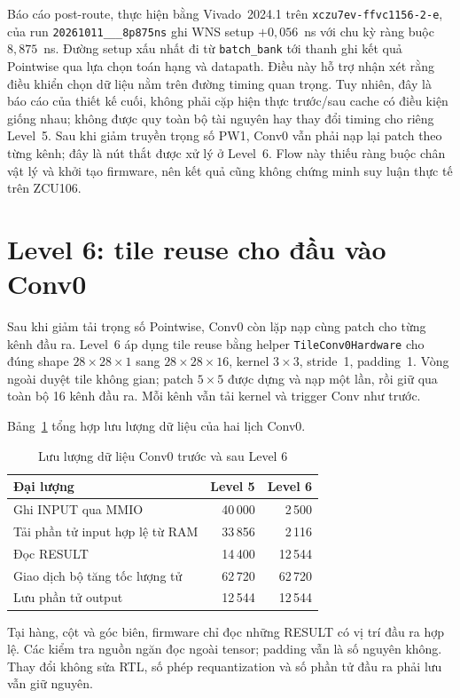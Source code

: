 Báo cáo post-route, thực hiện bằng Vivado~2024.1 trên \texttt{xczu7ev-ffvc1156-2-e}, của run \texttt{20261011\_\_\_\allowbreak8p875ns} ghi WNS setup $+0{,}056$~ns với chu kỳ ràng buộc $8{,}875$~ns. Đường setup xấu nhất đi từ \texttt{batch\_bank} tới thanh ghi kết quả Pointwise qua lựa chọn toán hạng và datapath. Điều này hỗ trợ nhận xét rằng điều khiển chọn dữ liệu nằm trên đường timing quan trọng. Tuy nhiên, đây là báo cáo của thiết kế cuối, không phải cặp hiện thực trước/sau cache có điều kiện giống nhau; không được quy toàn bộ tài nguyên hay thay đổi timing cho riêng Level~5. Sau khi giảm truyền trọng số PW1, Conv0 vẫn phải nạp lại patch theo từng kênh; đây là nút thắt được xử lý ở Level~6. Flow này thiếu ràng buộc chân vật lý và khởi tạo firmware, nên kết quả cũng không chứng minh suy luận thực tế trên ZCU106.

\section{Level 6: tile reuse cho đầu vào Conv0}
Sau khi giảm tải trọng số Pointwise, Conv0 còn lặp nạp cùng patch cho từng kênh đầu ra. Level~6 áp dụng tile reuse bằng helper \texttt{TileConv0Hardware} cho đúng shape $28\times28\times1$ sang $28\times28\times16$, kernel $3\times3$, stride~1, padding~1. Vòng ngoài duyệt tile không gian; patch $5\times5$ được dựng và nạp một lần, rồi giữ qua toàn bộ 16 kênh đầu ra. Mỗi kênh vẫn tải kernel và trigger Conv như trước.

Bảng~\ref{tab:conv0-reuse} tổng hợp lưu lượng dữ liệu của hai lịch Conv0.

\begin{table}[!ht]
\renewcommand{\arraystretch}{1.12}
\centering
\caption{Lưu lượng dữ liệu Conv0 trước và sau Level 6}
\label{tab:conv0-reuse}
\begin{tabular}{lrr}
\hline
Đại lượng & Level 5 & Level 6 \\
\hline
Ghi INPUT qua MMIO & 40\,000 & 2\,500 \\
Tải phần tử input hợp lệ từ RAM & 33\,856 & 2\,116 \\
Đọc RESULT & 14\,400 & 12\,544 \\
Giao dịch bộ tăng tốc lượng tử & 62\,720 & 62\,720 \\
Lưu phần tử output & 12\,544 & 12\,544 \\
\hline
\end{tabular}
\end{table}

Tại hàng, cột và góc biên, firmware chỉ đọc những RESULT có vị trí đầu ra hợp lệ. Các kiểm tra nguồn ngăn đọc ngoài tensor; padding vẫn là số nguyên không. Thay đổi không sửa RTL, số phép requantization và số phần tử đầu ra phải lưu vẫn giữ nguyên.

